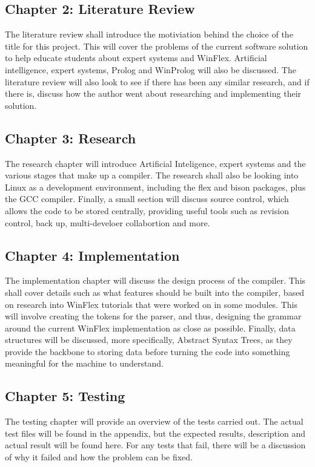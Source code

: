 \documentclass[12pt]{report}
\begin{document}
\subsection{Chapter 2: Literature Review}\label{sec:sub:chapter2}
The literature review shall introduce the motiviation behind the choice of the title for this project.  This will cover the problems of the current software solution to help educate students about expert systems and WinFlex.  Artificial intelligence, expert systems, Prolog and WinProlog will also be discussed.  The literature review will also look to see if there has been any similar research, and if there is, discuss how the author went about researching and implementing their solution.
\subsection{Chapter 3: Research}\label{sec:sub:chapter3}
The research chapter will introduce Artificial Inteligence, expert systems and the various stages that make up a compiler.  The research shall also be looking into Linux as a development environment, including the  flex and bison packages, plus the GCC compiler.  Finally, a small section will discuss source control, which allows the code to be stored centrally, providing useful tools such as revision control, back up, multi-develoer collabortion and more.
\subsection{Chapter 4: Implementation}\label{sec:sub:chapter4}
The implementation chapter will discuss the design process of the compiler.  This shall cover details such as what features should be built into the compiler, based on research into WinFlex tutorials that were worked on in some modules.  This will involve creating the tokens for the parser, and thus, designing the grammar around the current WinFlex implementation as close as possible.  Finally, data structures will be discussed, more specifically, Abstract Syntax Trees, as they provide the backbone to storing data before turning the code into something meaningful for the machine to understand.
\subsection{Chapter 5: Testing}\label{sec:chapter5}
The testing chapter will provide an overview of the tests carried out.  The actual test files will be found in the appendix, but the expected results, description and actual result will be found here.  For any tests that fail, there will be a discussion of why it failed and how the problem can be fixed.
\end{document}
